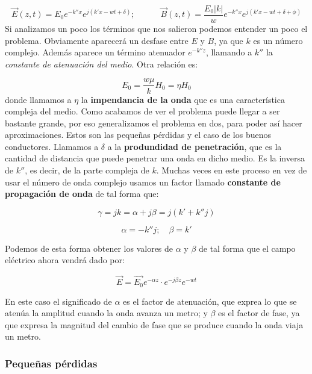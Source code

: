 \documentclass[12pt,a4paper]{article}
\newcommand{\tquad}{\quad \quad \quad}
\begin{document}
\begin{equation}
\vec{E}(z,t) = E_0 e^{-k''x} e^{j(k'x-wt+\delta)}; \tquad
\vec{B}(z,t) = \dfrac{E_0 |k|}{w} e^{-k''x} e^{j(k'x-wt+\delta+\phi)}
\end{equation}
Si analizamos un poco los términos que nos salieron podemos entender un poco el problema. Obviamente aparecerá un desfase entre $E$ y $B$, ya que $k$ es un número complejo. Además aparece un término atenuador $e^{-k''z}$, llamando a $k''$ la \textit{constante de atenuación del medio}. Otra relación es:

\begin{equation}
E_0 = \dfrac{w \mu}{k} H_0 = \eta H_0
\end{equation} 
donde llamamos a $\eta$ la \textbf{impendancia de la onda} que es una característica compleja del medio. Como acabamos de ver el problema puede llegar a ser bastante grande, por eso generalizamos el problema en dos, para poder así hacer aproximaciones. Estos son las pequeñas pérdidas y el caso de los buenos conductores. Llamamos a $\delta$ a la \textbf{produndidad de penetración}, que es la cantidad de distancia que puede penetrar una onda en dicho medio. Es la inversa de $k''$, es decir, de la parte compleja de $k$. Muchas veces en este proceso en vez de usar el número de onda complejo usamos un factor llamado \textbf{constante de propagación de onda} de tal forma que:

\begin{equation}
\gamma = j k = \alpha + j \beta = j(k'+k''j)
\end{equation}

\begin{equation}
\alpha = - k''j; \quad  \beta = k'
\end{equation}

Podemos de esta forma obtener los valores de $\alpha$ y $\beta$ de tal forma que el campo eléctrico ahora vendrá dado por:

\begin{equation}
\vec{E} = \vec{E_0} e^{- \alpha z} \cdot e^{- j \beta z} e^{-wt} 
\end{equation}

En este caso el significado de $\alpha$ es el factor de atenuación, que exprea lo que se atenúa la amplitud cuando la onda avanza un metro; y $\beta$ es el factor de fase, ya que expresa la magnitud del cambio de fase que se produce cuando la onda viaja un metro. 

\subsubsection{Pequeñas pérdidas}
\end{document}
